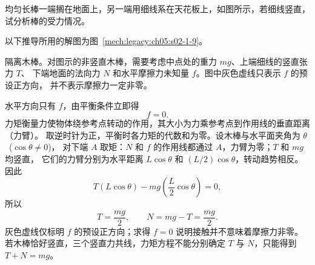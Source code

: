 {\begin{origexamplebox}{}\label{ch05:ex:s02-1-9}
\begin{minipage}[c]{0.62\linewidth}
均匀长棒一端搁在地面上，另一端用细线系在天花板上，如图所示，若细线竖直，
试分析棒的受力情况。
\end{minipage}\hfill
\begin{minipage}[c]{0.34\linewidth}
\centering

\end{minipage}
\end{origexamplebox}

\begin{xesolution}
以下推导所用的解图为图~\ref{mech:legacy:ch05:s02-1-9}。

隔离木棒。对图示的非竖直木棒，需要考虑中点处的重力 $mg$、上端细线的竖直张力 $T$、
下端地面的法向力 $N$ 和水平摩擦力未知量 $f$。图中灰色虚线只表示 $f$ 的预设正方向，
并不表示摩擦力一定非零。

\begin{center}
\begin{qualityfigure}
\label{mech:legacy:ch05:s02-1-9}
\end{qualityfigure}
\end{center}

水平方向只有 $f$，由平衡条件立即得
\[
  \boxed{f=0}.
\]
力矩衡量力使物体绕参考点转动的作用，其大小为力乘参考点到作用线的垂直距离（力臂）。
取逆时针为正，平衡时各力矩的代数和为零。设木棒与水平面夹角为 $\theta$\ ($\cos\theta\ne0$)，
对下端 $A$ 取矩：$N$ 和 $f$ 的作用线都通过 $A$，力臂为零；$T$ 和 $mg$ 均竖直，
它们的力臂分别为水平距离 $L\cos\theta$ 和 $(L/2)\cos\theta$，转动趋势相反。因此
\[
  T(L\cos\theta)-mg\left(\frac L2\cos\theta\right)=0,
\]
所以
\[
  \boxed{T=\frac{mg}{2}},\qquad
  \boxed{N=mg-T=\frac{mg}{2}}.
\]
灰色虚线仅标明 $f$ 的预设正方向；求得 $f=0$ 说明接触并不意味着摩擦力非零。
若木棒恰好竖直，三个竖直力共线，力矩方程不能分别确定 $T$ 与 $N$，只能得到 $T+N=mg$。
\end{xesolution}
}

